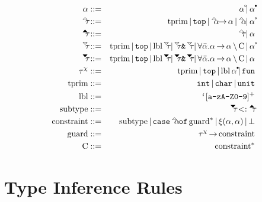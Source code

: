 \documentclass{article}
\begin{document}
\begin{eqnarray*}
    \alpha          &::=&       \alphaOpen
                           \gOr \alphaClosed
\\
    \tauUpOpen      &::=&       \tprim
                           \gOr \gtTop
                           \gOr \alphaUp \fto \alpha
                           \gOr \alphaUp
                           \gOr \alphaOpen
\\
    \tauUpClosed    &::=&       \tauUpOpen
                           \gOr \alpha
\\
    \tauDownOpen    &::=&       \tprim
                           \gOr \gtTop
                           \gOr \lbl \tauDownOpen
                           \gOr \tauDownOpen \gtAmp \tauDownOpen
                           \gOr \forall \alphaList. \alpha \fto \alpha \cSeparator \constraintList
                           \gOr \alphaOpen
\\
    \tauDownClosed  &::=&       \tprim
                           \gOr \gtTop
                           \gOr \lbl \tauDownClosed
                           \gOr \tauDownClosed \gtAmp \tauDownClosed
                           \gOr \forall \alphaList. \alpha \fto \alpha \cSeparator \constraintList
                           \gOr \alpha
\\
    \tauChi         &::=&       \tprim
                           \gOr \gtTop
                           \gOr \lbl \alphaClosed
                           \gOr \gtFun
\\
    \tprim          &::=&       \gtInt
                           \gOr \gtChar
                           \gOr \gtUnit
\\
    \lbl            &::=&       \gtBt [\texttt{a-zA-Z0-9}]^+
\\
    \subtype        &::=&       \tauDownClosed <: \tauUpClosed
\\
    \constraint     &::=&       \subtype
                           \gOr \gtCase \alphaUp \gtOf \guard^*
                           \gOr \equatable{\alpha}{\alpha}
                           \gOr \gtBottom
\\
    \guard          &::=&       \tauChi \fto \constraint
\\
    \constraintList &::=&       \constraint^*
\end{eqnarray*}

\section*{Type Inference Rules}
\end{document}
